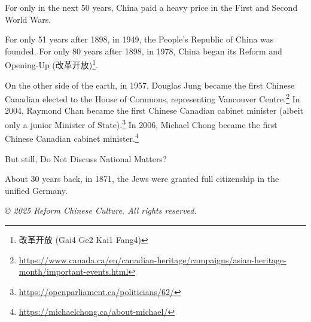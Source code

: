 \documentclass[12pt]{article}
\begin{document}
For only in the next 50 years, China paid a heavy price in the First and Second World Wars.

For only 51 years after 1898, in 1949, the People's Republic of China was founded. For only 80 years after 1898, in 1978, China began its Reform and Opening-Up (改革开放)\footnote{改革开放 (Gai4 Ge2 Kai1 Fang4)}.

On the other side of the earth, in 1957, Douglas Jung became the first Chinese Canadian elected to the House of Commons, representing Vancouver Centre.\footnote{\href{https://www.canada.ca/en/canadian-heritage/campaigns/asian-heritage-month/important-events.html}{https://www.canada.ca/en/canadian-heritage/campaigns/asian-heritage-month/important-events.html}} In 2004, Raymond Chan became the first Chinese Canadian cabinet minister (albeit only a junior Minister of State).\footnote{\href{https://openparliament.ca/politicians/62/}{https://openparliament.ca/politicians/62/}} In 2006, Michael Chong became the first Chinese Canadian cabinet minister.\footnote{\href{https://michaelchong.ca/about-michael/}{https://michaelchong.ca/about-michael/}}

But still, Do Not Discuss National Matters?

About 30 years back, in 1871, the Jews were granted full citizenship in the unified Germany.

\vspace{2cm}

\begin{center}
    \textit{© 2025 Reform Chinese Culture. All rights reserved.}
\end{center}
\end{document}
